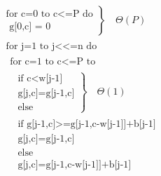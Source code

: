         \begin{figure}[h!]
            \centering
            \begin{equation*}
                \left.
                    \begin{aligned}
                        \left.
                            \begin{aligned}
                                \text{for c=0 to c}<\text{=P do}\\
                                \text{  g[0,c] = 0 }
                            \end{aligned}
                        \right\}
                        \quad\Theta(P)\\
                    \left.
                        \begin{aligned}
                            \text{for j=1 to j}<\text{<=n do}\\
                            \left.
                                \begin{aligned}
                                    \text{for c=1 to c}<\text{=P to}\\
                                    \left.
                                        \begin{aligned}
                                            \left.
                                                \begin{aligned}
                                                    \text{if c}<\text{w[j-1]}\\
                                                    \text{g[j,c]=g[j-1,c]}\\
                                                    \text{else}
                                                \end{aligned}
                                            \right\}
                                            \quad\Theta(1)
                                            \\
                                            \left.
                                                \begin{aligned}
                                                    \text{if g[j-1,c]}>\text{=g[j-1,c-w[j-1]]+b[j-1]}\\
                                                    \text{g[j,c]=g[j-1,c]}\\
                                                    \text{else}\\
                                                    \text{g[j,c]=g[j-1,c-w[j-1]]+b[j-1]}

\end{aligned}
\end{aligned}
\end{aligned}
\end{aligned}
\end{aligned}
\end{equation*}
\end{figure}
